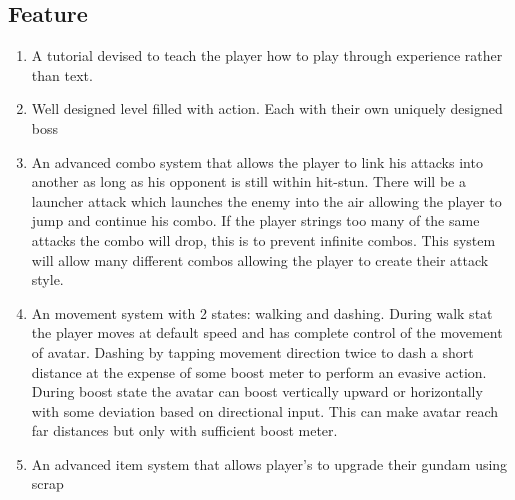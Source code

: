 \documentclass{article}
\begin{document}
\subsection*{Feature}
    \begin{enumerate}
        \item A tutorial devised to teach the player how to play through experience rather than text.
        \item Well designed level filled with action. Each with their own uniquely designed boss
        \item An advanced combo system that allows the player to link his attacks into another as long as his opponent is still within hit-stun. There will be a launcher attack which launches the enemy into the air allowing the player to jump and continue his combo. If the player strings too many of the same attacks the combo will drop, this is to prevent infinite combos. This system will allow many different combos allowing the player to create their attack style.
        \item An movement system with 2 states: walking and dashing. During walk stat the player moves at default speed and has complete control of the movement of avatar. Dashing by tapping movement direction twice to dash a short distance at the expense of some boost meter to perform an evasive action. During boost state the avatar can boost vertically upward or horizontally with some deviation based on directional input. This can make avatar reach far distances but only with sufficient boost meter.
        \item An advanced item system that allows player's to upgrade their gundam using scrap 
    \end{enumerate}
    
\end{document}
